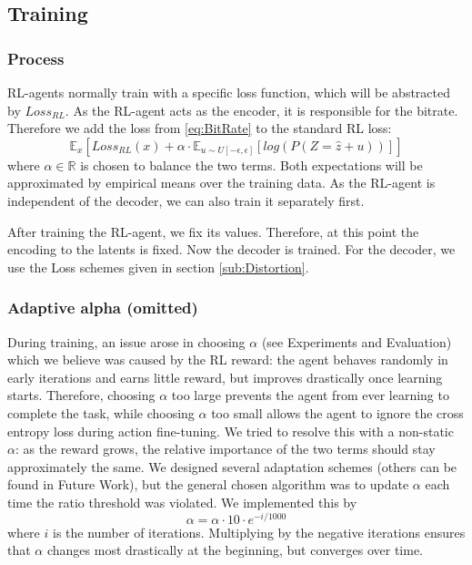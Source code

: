 
\subsection{Training}
    \subsubsection{Process}
        RL-agents normally train with a specific loss function, which will be
        abstracted by $Loss_{RL}$. As the RL-agent acts as the encoder, it
        is responsible for the bitrate. Therefore we add the loss from
        \ref{eq:BitRate} to the standard RL loss:
        \begin{equation}\label{eq:RL_Training_Loss}
            \mathbb{E}_{x}[Loss_{RL}(x) + \alpha\cdot \mathbb{E}_{u \sim U[-\epsilon, \epsilon]}[log(P(Z=\hat{z} + u))]]
        \end{equation} where $\alpha \in \mathbb{R}$ is chosen to balance the two terms.
        Both expectations will be approximated by empirical means over the training
        data. As the RL-agent is independent of the decoder, we can also train it
        separately first.

        After training the RL-agent, we fix its values. Therefore, at this point
        the encoding to the latents is fixed. Now the decoder is trained. For the decoder, we use the Loss
        schemes given in section \ref{sub:Distortion}.


    \subsubsection{Adaptive alpha (omitted)}\label{sub:Adaptive_Alpha}
        During training, an issue arose in choosing $\alpha$ (see Experiments and
        Evaluation) which we believe was caused by the RL reward: the agent behaves
        randomly in early iterations and earns little reward, but improves
        drastically once learning starts. Therefore, choosing $\alpha$ too large
        prevents the agent from ever learning to complete the task, while choosing
        $\alpha$ too small allows the agent to ignore the cross entropy loss during action
        fine-tuning. We tried to resolve this with a non-static $\alpha$: as
        the reward grows, the relative importance of the two terms should stay
        approximately the same. We designed several adaptation schemes (others can be
        found in Future Work), but the general chosen algorithm was to update $\alpha$
        each time the ratio threshold was violated. We implemented this by
        \begin{equation}
            \alpha = \alpha \cdot 10 \cdot e^{-i / 1000}
        \end{equation}
        where $i$ is the number of iterations. Multiplying by the negative iterations
        ensures that $\alpha$ changes most drastically at the beginning, but
        converges over time.